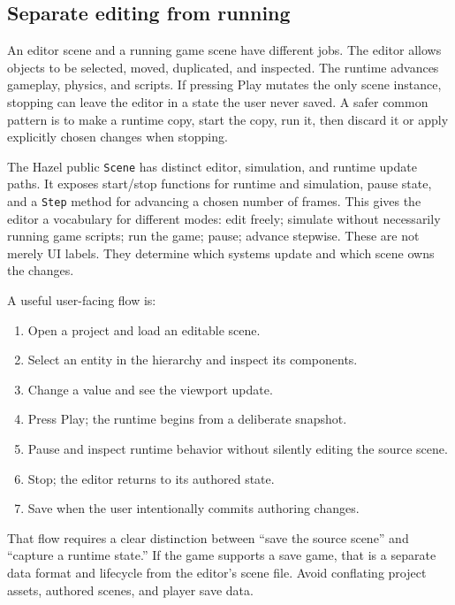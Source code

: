 \subsection{Separate editing from running}\label{06-engine-ii-ch032-separate-editing-from-running}

\hypertarget{06-engine-ii-ch032-separate-editing-from-running}{}

An editor scene and a running game scene have different jobs. The editor allows objects to be selected, moved, duplicated, and inspected. The runtime advances gameplay, physics, and scripts. If pressing Play mutates the only scene instance, stopping can leave the editor in a state the user never saved. A safer common pattern is to make a runtime copy, start the copy, run it, then discard it or apply explicitly chosen changes when stopping.

The Hazel public \texttt{Scene} has distinct editor, simulation, and runtime update paths. It exposes start/stop functions for runtime and simulation, pause state, and a \texttt{Step} method for advancing a chosen number of frames. This gives the editor a vocabulary for different modes: edit freely; simulate without necessarily running game scripts; run the game; pause; advance stepwise. These are not merely UI labels. They determine which systems update and which scene owns the changes.

A useful user-facing flow is:

\begin{enumerate}
\def\labelenumi{\arabic{enumi}.}
\tightlist
\item
  Open a project and load an editable scene.
\item
  Select an entity in the hierarchy and inspect its components.
\item
  Change a value and see the viewport update.
\item
  Press Play; the runtime begins from a deliberate snapshot.
\item
  Pause and inspect runtime behavior without silently editing the source scene.
\item
  Stop; the editor returns to its authored state.
\item
  Save when the user intentionally commits authoring changes.
\end{enumerate}

That flow requires a clear distinction between ``save the source scene'' and ``capture a runtime state.'' If the game supports a save game, that is a separate data format and lifecycle from the editor's scene file. Avoid conflating project assets, authored scenes, and player save data.


